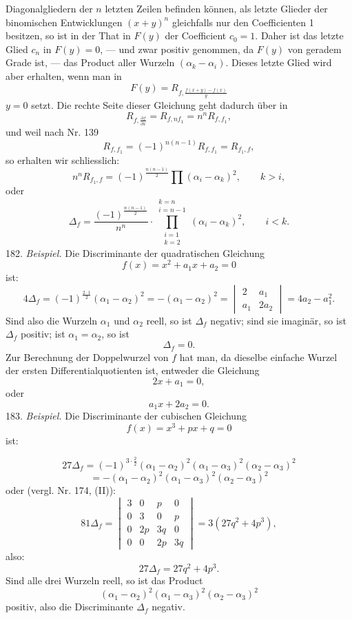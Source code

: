 \documentclass[11pt]{article}
\providecommand{\weberpage}[1]{}
\let\Delta\varDelta
\begin{document}
Diagonalgliedern der $n$ letzten Zeilen befinden können, als letzte
Glieder der binomischen Entwicklungen $(x+y)^n$ gleichfalls nur den
Coefficienten 1 besitzen, so ist in der That in $F(y)$ der Coefficient
$c_0 = 1$. Daher ist das letzte Glied $c_n$ in $F(y) = 0$, --- und zwar
positiv genommen, da $F(y)$ von geradem Grade ist, --- das Product
aller Wurzeln $(\alpha_k - \alpha_i)$. Dieses letzte Glied wird aber erhalten, wenn
man in
\[
F(y) = R_{f, \frac{f(x+y)-f(x)}{y}}
\]
$y=0$ setzt. Die rechte Seite dieser Gleichung geht dadurch über in
\[
R_{f, \frac{\partial f}{\partial x}} = R_{f, nf_1} = n^n R_{f,f_1},
\]
und weil nach Nr. 139
\[
R_{f,f_1} = (-1)^{n(n-1)} R_{f,f_1} = R_{f_1,f}, %
\]
so erhalten wir schliesslich:
\[
n^n R_{f_1,f} = (-1)^{\frac{n(n-1)}{2}} \prod (\alpha_i - \alpha_k)^2, \qquad k>i,
\]
oder
\[
\Delta_f = \frac{(-1)^{\frac{n(n-1)}{2}}}{n^n} \cdot \prod_{\substack{i=1\\k=2}}^{\substack{k=n\\i=n-1}} (\alpha_i - \alpha_k)^2, \qquad i<k.
\]
182. \textit{Beispiel.} Die Discriminante der quadratischen Gleichung
\[
f(x) = x^2 + a_1 x + a_2 = 0
\]
ist:
\[
4\Delta_f = (-1)^{\frac{2\cdot 1}{2}} (\alpha_1-\alpha_2)^2 = -(\alpha_1-\alpha_2)^2 = \begin{vmatrix} 2 & a_1 \\ a_1 & 2a_2 \end{vmatrix} = 4a_2 - a_1^2.
\]
Sind also die Wurzeln $\alpha_1$ und $\alpha_2$ reell, so ist $\Delta_f$ negativ; sind sie
imaginär, so ist $\Delta_f$ positiv; ist $\alpha_1 = \alpha_2$, so ist
\[
\Delta_f = 0.
\]
Zur Berechnung der Doppelwurzel von $f$ hat man, da dieselbe einfache Wurzel der ersten Differentialquotienten ist, entweder die
Gleichung
\[
2x + a_1 = 0,
\]
oder
\[
a_1 x + 2a_2 = 0.
\]
183. \textit{Beispiel.} Die Discriminante der cubischen Gleichung
\[
f(x) = x^3 + px + q = 0
\]
ist:


\weberpage{195}
\[
27\Delta_f = (-1)^{3\cdot\frac{2}{2}}(\alpha_1-\alpha_2)^2(\alpha_1-\alpha_3)^2(\alpha_2-\alpha_3)^2
\]
\[
= -(\alpha_1-\alpha_2)^2(\alpha_1-\alpha_3)^2(\alpha_2-\alpha_3)^2
\]
oder (vergl. Nr. 174, (II)):
\[
81\Delta_f = \begin{vmatrix} 3 & 0 & p & 0 \\ 0 & 3 & 0 & p \\ 0 & 2p & 3q & 0 \\ 0 & 0 & 2p & 3q \end{vmatrix} = 3(27q^2+4p^3),
\]
also:
\[
27\Delta_f = 27q^2+4p^3.
\]
Sind alle drei Wurzeln reell, so ist das Product
\[
(\alpha_1-\alpha_2)^2(\alpha_1-\alpha_3)^2(\alpha_2-\alpha_3)^2
\]
positiv, also die Discriminante $\Delta_f$ negativ.
\end{document}
